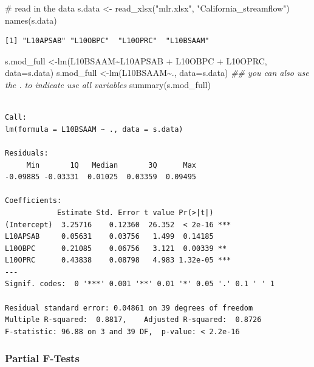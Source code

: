 \documentclass[
  10pt,
  letterpaper,
  DIV=11,
  numbers=noendperiod]{scrartcl}
\newenvironment{Shaded}{\begin{snugshade}}{\end{snugshade}}
\newcommand{\AttributeTok}[1]{\textcolor[rgb]{0.40,0.45,0.13}{#1}}
\newcommand{\CommentTok}[1]{\textcolor[rgb]{0.37,0.37,0.37}{#1}}
\newcommand{\DocumentationTok}[1]{\textcolor[rgb]{0.37,0.37,0.37}{\textit{#1}}}
\newcommand{\FunctionTok}[1]{\textcolor[rgb]{0.28,0.35,0.67}{#1}}
\newcommand{\NormalTok}[1]{\textcolor[rgb]{0.00,0.23,0.31}{#1}}
\newcommand{\OtherTok}[1]{\textcolor[rgb]{0.00,0.23,0.31}{#1}}
\newcommand{\SpecialCharTok}[1]{\textcolor[rgb]{0.37,0.37,0.37}{#1}}
\newcommand{\StringTok}[1]{\textcolor[rgb]{0.13,0.47,0.30}{#1}}
\begin{document}
\begin{Shaded}
\begin{Highlighting}[]
\CommentTok{\# read in the data}
\NormalTok{s.data }\OtherTok{\textless{}{-}} \FunctionTok{read\_xlsx}\NormalTok{(}\StringTok{"mlr.xlsx"}\NormalTok{, }\StringTok{"California\_streamflow"}\NormalTok{)}
\FunctionTok{names}\NormalTok{(s.data)}
\end{Highlighting}
\end{Shaded}

\begin{verbatim}
[1] "L10APSAB" "L10OBPC"  "L10OPRC"  "L10BSAAM"
\end{verbatim}

\begin{Shaded}
\begin{Highlighting}[]
\NormalTok{s.mod\_full }\OtherTok{\textless{}{-}}\FunctionTok{lm}\NormalTok{(L10BSAAM}\SpecialCharTok{\textasciitilde{}}\NormalTok{L10APSAB }\SpecialCharTok{+}\NormalTok{ L10OBPC }\SpecialCharTok{+}\NormalTok{ L10OPRC, }\AttributeTok{data=}\NormalTok{s.data)}
\NormalTok{s.mod\_full }\OtherTok{\textless{}{-}}\FunctionTok{lm}\NormalTok{(L10BSAAM}\SpecialCharTok{\textasciitilde{}}\NormalTok{., }\AttributeTok{data=}\NormalTok{s.data) }\DocumentationTok{\#\# you can also use the . to indicate use all variables}
\FunctionTok{summary}\NormalTok{(s.mod\_full)}
\end{Highlighting}
\end{Shaded}

\begin{verbatim}

Call:
lm(formula = L10BSAAM ~ ., data = s.data)

Residuals:
     Min       1Q   Median       3Q      Max 
-0.09885 -0.03331  0.01025  0.03359  0.09495 

Coefficients:
            Estimate Std. Error t value Pr(>|t|)    
(Intercept)  3.25716    0.12360  26.352  < 2e-16 ***
L10APSAB     0.05631    0.03756   1.499  0.14185    
L10OBPC      0.21085    0.06756   3.121  0.00339 ** 
L10OPRC      0.43838    0.08798   4.983 1.32e-05 ***
---
Signif. codes:  0 '***' 0.001 '**' 0.01 '*' 0.05 '.' 0.1 ' ' 1

Residual standard error: 0.04861 on 39 degrees of freedom
Multiple R-squared:  0.8817,    Adjusted R-squared:  0.8726 
F-statistic: 96.88 on 3 and 39 DF,  p-value: < 2.2e-16
\end{verbatim}

\hypertarget{partial-f-tests}{%
\subsubsection{Partial F-Tests}\label{partial-f-tests}}
\end{document}
